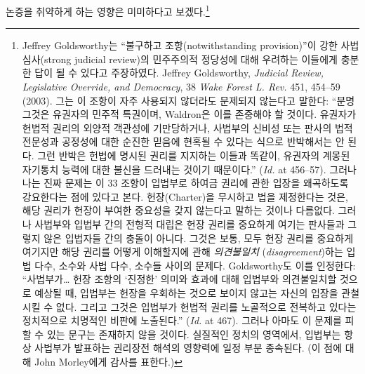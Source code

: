 \documentclass[a4paper,12pt,oneside]{article}  %
\newcommand{\emphksans}[1]{%
  {\kopubhangul\kopublatin\textsl{#1}}%
}
\begin{document}
논증을 취약하게 하는 영향은 미미하다고 보겠다.\footnote{Jeffrey
  Goldsworthy는 ``불구하고 조항(notwithstanding provision)''이 강한
  사법심사(strong judicial review)의 민주주의적 정당성에 대해 우려하는
  이들에게 충분한 답이 될 수 있다고 주장하였다. Jeffrey Goldsworthy,
  \emph{Judicial Review, Legislative Override, and Democracy}, 38
  \emph{Wake Forest L. Rev.} 451, 454--59 (2003). 그는 이 조항이 자주
  사용되지 않더라도 문제되지 않는다고 말한다: ``분명 그것은 유권자의
  민주적 특권이며, Waldron은 이를 존중해야 할 것이다. 유권자가 헌법적
  권리의 외양적 객관성에 기만당하거나, 사법부의 신비성 또는 판사의 법적
  전문성과 공정성에 대한 순진한 믿음에 현혹될 수 있다는 식으로
  반박해서는 안 된다. 그런 반박은 헌법에 명시된 권리를 지지하는 이들과
  똑같이, 유권자의 계몽된 자기통치 능력에 대한 불신을 드러내는 것이기
  때문이다.'' (\emph{Id.} at 456--57). 그러나 나는 진짜 문제는 이 33
  조항이 입법부로 하여금 권리에 관한 입장을 왜곡하도록 강요한다는 점에
  있다고 본다. 헌장(Charter)을 무시하고 법을 제정한다는 것은, 해당
  권리가 헌장이 부여한 중요성을 갖지 않는다고 말하는 것이나 다름없다.
  그러나 사법부와 입법부 간의 전형적 대립은 헌장 권리를 중요하게 여기는
  판사들과 그렇지 않은 입법자들 간의 충돌이 아니다. 그것은 보통, 모두
  헌장 권리를 중요하게 여기지만 해당 권리를 어떻게 이해할지에 관해
  \emphksans{의견불일치}(\emph{disagreement})하는 입법 다수, 소수와 사법 다수,
  소수들 사이의 문제다. Goldsworthy도 이를 인정한다: ``사법부가\ldots{}
  헌장 조항의 `진정한' 의미와 효과에 대해 입법부와 의견불일치할 것으로
  예상될 때, 입법부는 헌장을 우회하는 것으로 보이지 않고는 자신의 입장을
  관철시킬 수 없다. 그리고 그것은 입법부가 헌법적 권리를 노골적으로
  전복하고 있다는 정치적으로 치명적인 비판에 노출된다.'' (\emph{Id.} at
  467). 그러나 아마도 이 문제를 피할 수 있는 문구는 존재하지 않을
  것이다. 실질적인 정치의 영역에서, 입법부는 항상 사법부가 발표하는
  권리장전 해석의 영향력에 일정 부분 종속된다. (이 점에 대해 John
  Morley에게 감사를 표한다.)}
\end{document}
